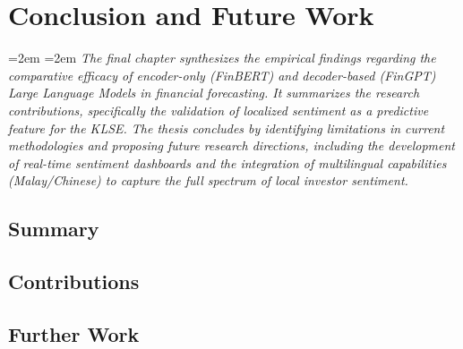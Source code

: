\documentclass[singlespace]{ucetd}
\newcommand{\chapterabstract}[1]{%
  \par\vspace{1em}
  \begingroup
  \leftskip=2em
  \rightskip=2em
  \noindent\itshape
  #1
  \par
  \endgroup
  \vspace{1.5em}
}
\begin{document}
\chapter{Conclusion and Future Work}

\chapterabstract{The final chapter synthesizes the empirical findings regarding the comparative efficacy of encoder-only (FinBERT) and decoder-based (FinGPT) Large Language Models in financial forecasting. It summarizes the research contributions, specifically the validation of localized sentiment as a predictive feature for the KLSE. The thesis concludes by identifying limitations in current methodologies and proposing future research directions, including the development of real-time sentiment dashboards and the integration of multilingual capabilities (Malay/Chinese) to capture the full spectrum of local investor sentiment.}

\section{Summary}
\section{Contributions}
\section{Further Work}




\makebibliography
\nocite{*}

%
%
\end{document}
